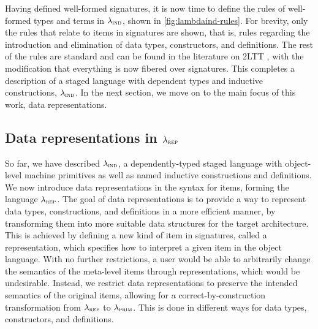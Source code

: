 Having defined well-formed signatures, it is now time to define the rules of
well-formed types and terms in $\lambda_{\textsc{ind}}$, shown in
\cref{fig:lambdaind-rules}.  For brevity, only the rules that relate to items in signatures
are shown, that is, rules regarding the introduction and elimination of data
types, constructors, and definitions. The rest of the rules are standard and
can be found in the literature on 2LTT \cite{Kovacs2022-vb}, with the
modification that everything is now fibered over signatures. This completes a
description of a staged language with dependent types and inductive
constructions, $\lambda_{\textsc{ind}}$. In the next section, we move on to the main focus
of this work, data representations.

\subsection{Data representations in $\lambda_{\textsc{rep}}$}\label{sub:lambdarep}

So far, we have described $\lambda_{\textsc{ind}}$, a dependently-typed staged language
with object-level machine primitives as well as named inductive constructions
and definitions. We now introduce data representations in the syntax for items,
forming the language $\lambda_{\textsc{rep}}$. The goal of data representations is to
provide a way to represent data types, constructions, and definitions in a more
efficient manner, by transforming them into more suitable data structures for
the target architecture. This is achieved by defining a new kind of item in
signatures, called a representation, which specifies how to interpret a given
item in the object language. With no further restrictions, a user would be able
to arbitrarily change the semantics of the meta-level items through
representations, which would be undesirable. Instead, we restrict data
representations to preserve the intended semantics of the original items,
allowing for a correct-by-construction transformation from $\lambda_{\textsc{rep}}$ to
$\lambda_{\textsc{prim}}$. This is done in different ways for data types, constructors, and
definitions.

